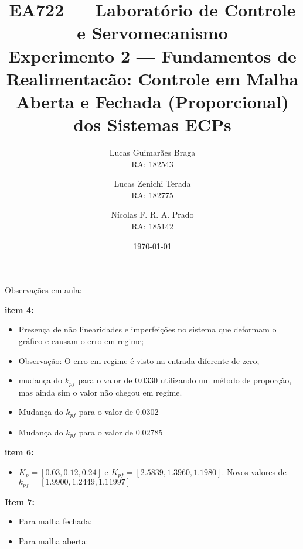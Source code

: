 \documentclass{ZenTera}
\title{\textbf{EA722 --- Laboratório de Controle e Servomecanismo\vspace{7mm}\\\large Experimento 2 --- Fundamentos de Realimentacão: Controle em Malha Aberta e Fechada (Proporcional) dos Sistemas ECPs} }
\author{Lucas Guimarães Braga \\RA: 182543 \and Lucas Zenichi Terada \\RA: 182775 \and Nícolas F. R. A. Prado \\RA: 185142}
\date{\today}
\begin{document}
%
\maketitle 


Observações em aula:

\textbf{item 4:} 
\begin{itemize}
    \item Presença de não linearidades e imperfeições no sistema que deformam o gráfico e causam o erro em regime;

    \item Observação: O erro em regime é visto na entrada diferente de zero;
    
    \item mudança do $k_{pf}$ para o valor de 0.0330 utilizando um método de proporção, mas ainda sim o valor não chegou em regime.
    
    \item Mudança do $k_{pf}$ para o valor de 0.0302
    
    \item Mudança do $k_{pf}$ para o valor de 0.02785
\end{itemize}

\textbf{item 6:}
\begin{itemize}
    \item $K_p = [0.03, 0.12, 0.24]$ e $K_{pf} = [2.5839, 1.3960, 1.1980] $. Novos valores de $k_{pf} = [1.9900,1.2449,1.11997]$
\end{itemize}

\textbf{Item 7:}
\begin{itemize}
    \item Para malha fechada:
    
    \item Para malha aberta:
\end{itemize}
\end{document}
